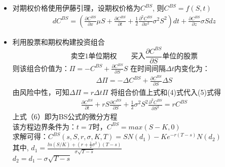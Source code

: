 \documentclass{article}
\begin{document}
\begin{itemize}
	\item 对期权价格使用伊藤引理，设期权价格为$C^{BS}$,
	则$C^{BS} = f(S, t)$\\
\begin{align} 
dC^{BS} = (\frac{\partial C^{BS}}{\partial x}\mu S + \frac{\partial C^{BS}}{\partial t} +\frac{1}{2}\frac{\partial^2 C^{BS}}{\partial x^2}\sigma^2 S^2)dt
+\frac{\partial C^{BS}}{\partial z}\sigma Sdz 
\end{align}
\item 利用股票和期权构建投资组合\\
\[\text{卖空1单位期权}
\qquad \text{买入}\frac{\partial C^{BS}}{\partial S}\text{单位的股票} \]
则该组合价值为：$ \Pi = - C^{BS} + \frac{\partial C^{BS}}{\partial S} S$
在时间间隔$ \Delta t $内变化为：\\
\begin{align}
\Delta \Pi =  -\Delta C^{BS} + \frac{\partial C^{BS}}{\partial S} \Delta S
\end{align}
由风险中性，可知$\Delta \Pi = r \Delta t \Pi $
将组合价值上式和(4)式代入(5)式得\\
\begin{align}
\frac{\partial C^{BS}}{\partial t} + r S \frac{\partial C^{BS}}{\partial S}
+ \frac{1}{2} \sigma^2 S^2 \frac{\partial^2 C^{BS}}{\partial S^2} 
= r C^{BS}
\end{align}
上式（6）即为BS公式的微分方程\\
该方程边界条件为：$ t = T \text{时，} C^{BS} = max(S-K,0)$\\
求解可得：$C^{BS}(s,S,r,\sigma,K,T) = SN(d_{1})-Ke^{-r(T-s)}N(d_{2})$\\
其中, $d_{1}=\frac{ln(S/K)+
		(r+\frac{1}{2}\sigma^{2})(T-s)}{\sigma\sqrt{T-s}}$\\
	$d_{2} = d_{1}-\sigma\sqrt{T-s}$

\end{itemize}
\end{document}
